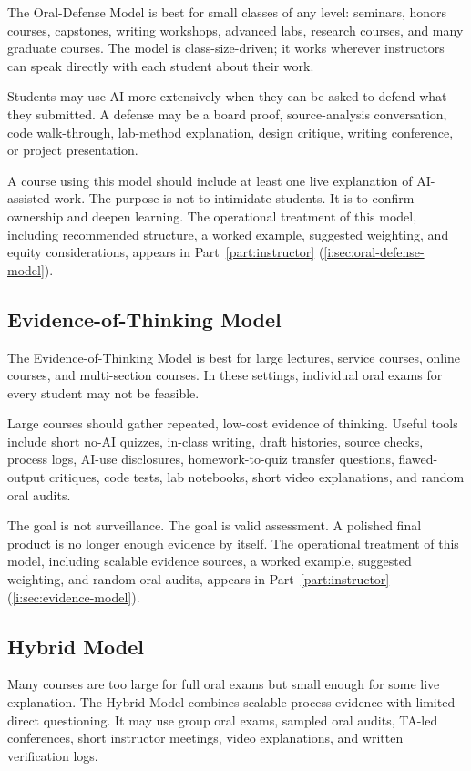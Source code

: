 \documentclass{SIAMbook2023}
\begin{document}
The Oral-Defense Model is best for small classes of any level: seminars, honors courses, capstones, writing workshops, advanced labs, research courses, and many graduate courses. The model is class-size-driven; it works wherever instructors can speak directly with each student about their work.

Students may use AI more extensively when they can be asked to defend what they submitted. A defense may be a board proof, source-analysis conversation, code walk-through, lab-method explanation, design critique, writing conference, or project presentation.

A course using this model should include at least one live explanation of AI-assisted work. The purpose is not to intimidate students. It is to confirm ownership and deepen learning. The operational treatment of this model, including recommended structure, a worked example, suggested weighting, and equity considerations, appears in Part~\ref{part:instructor} (\cref{i:sec:oral-defense-model}).

\subsection{Evidence-of-Thinking Model}
\label{u:subsec:evidence-thinking}

The Evidence-of-Thinking Model is best for large lectures, service courses, online courses, and multi-section courses. In these settings, individual oral exams for every student may not be feasible.

Large courses should gather repeated, low-cost evidence of thinking. Useful tools include short no-AI quizzes, in-class writing, draft histories, source checks, process logs, AI-use disclosures, homework-to-quiz transfer questions, flawed-output critiques, code tests, lab notebooks, short video explanations, and random oral audits.

The goal is not surveillance. The goal is valid assessment. A polished final product is no longer enough evidence by itself. The operational treatment of this model, including scalable evidence sources, a worked example, suggested weighting, and random oral audits, appears in Part~\ref{part:instructor} (\cref{i:sec:evidence-model}).

\subsection{Hybrid Model}
\label{u:subsec:hybrid}

Many courses are too large for full oral exams but small enough for some live explanation. The Hybrid Model combines scalable process evidence with limited direct questioning. It may use group oral exams, sampled oral audits, TA-led conferences, short instructor meetings, video explanations, and written verification logs.
\end{document}
